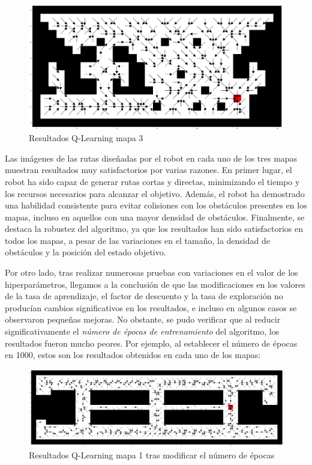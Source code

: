\documentclass[conference,a4paper]{IEEEtran}
\begin{document}
\begin{figure}[h]
  \centering
  \includegraphics[scale=0.33]{resultado_qlearning_mapa_3}
  \caption{Resultados Q-Learning mapa 3}
  \label{fig:resultado_qlearning_mapa_3}
\end{figure}

Las imágenes de las rutas diseñadas por el robot en cada uno de los tres mapas muestran resultados muy satisfactorios por varias razones.
En primer lugar, el robot ha sido capaz de generar rutas cortas y directas, minimizando el tiempo y los recursos necesarios para alcanzar el objetivo.
Además, el robot ha demostrado una habilidad consistente para evitar colisiones con los obstáculos presentes en los mapas, incluso en aquellos con una mayor densidad de obstáculos. Finalmente, se destaca la robustez del algoritmo, 
ya que los resultados han sido satisfactorios en todos los mapas, a pesar de las variaciones en el tamaño, la densidad de obstáculos y la posición del estado objetivo.\newline

Por otro lado, tras realizar numerosas pruebas con variaciones en el valor de los hiperparámetros, llegamos a la conclusión de que las modificaciones en los valores de la tasa de aprendizaje, el factor de descuento y la tasa de exploración no producían cambios significativos en los resultados,
e incluso en algunos casos se observaron pequeñas mejoras. No obstante, se pudo verificar que al reducir significativamente el \textit{número de épocas de entrenamiento} 
del algoritmo, los resultados fueron mucho peores. Por ejemplo, al establecer el número de épocas en 1000,
estos son los resultados obtenidos en cada uno de los mapas:

\begin{figure}[h]
  \centering
  \includegraphics[scale=0.33]{resultado_2_qlearning_mapa_1}
  \caption{Resultados Q-Learning mapa 1 tras modificar el número de épocas}
  \label{fig:resultado_2_qlearning_mapa_1}
\end{figure}
\end{document}
